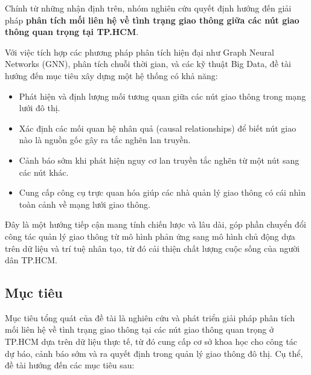 Chính từ những nhận định trên, nhóm nghiên cứu quyết định hướng đến giải pháp \textbf{phân tích mối liên hệ về tình trạng giao thông giữa các nút giao thông quan trọng tại TP.HCM}. %


Với việc tích hợp các phương pháp phân tích hiện đại như Graph Neural Networks (GNN), phân tích chuỗi thời gian, và các kỹ thuật Big Data, đề tài hướng đến mục tiêu xây dựng một hệ thống có khả năng:

\begin{itemize}
    \item Phát hiện và định lượng mối tương quan giữa các nút giao thông trong mạng lưới đô thị.
    \item Xác định các mối quan hệ nhân quả (causal relationships) để biết nút giao nào là nguồn gốc gây ra tắc nghẽn lan truyền.
    \item Cảnh báo sớm khi phát hiện nguy cơ lan truyền tắc nghẽn từ một nút sang các nút khác.
    \item Cung cấp công cụ trực quan hóa giúp các nhà quản lý giao thông có cái nhìn toàn cảnh về mạng lưới giao thông.
\end{itemize}

Đây là một hướng tiếp cận mang tính chiến lược và lâu dài, góp phần chuyển đổi công tác quản lý giao thông từ mô hình phản ứng sang mô hình chủ động dựa trên dữ liệu và trí tuệ nhân tạo, từ đó cải thiện chất lượng cuộc sống của người dân TP.HCM.

\newpage
\subsection{Mục tiêu}
Mục tiêu tổng quát của đề tài là nghiên cứu và phát triển giải pháp phân tích mối liên hệ về tình trạng giao thông tại các nút giao thông quan trọng ở TP.HCM dựa trên dữ liệu thực tế, từ đó cung cấp cơ sở khoa học cho công tác dự báo, cảnh báo sớm và ra quyết định trong quản lý giao thông đô thị. Cụ thể, đề tài hướng đến các mục tiêu sau:

